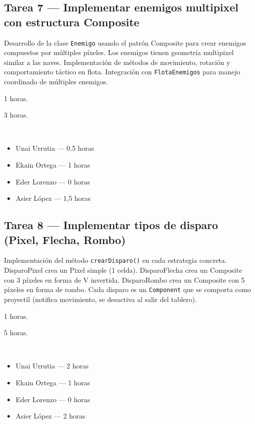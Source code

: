 \documentclass[12pt, a4paper]{article}
\begin{document}
\subsection*{Tarea 7 — Implementar enemigos multipixel con estructura Composite}
\begin{description}[leftmargin=2em, style=nextline]
    \item[\textbf{Descripción:}] Desarrollo de la clase \texttt{Enemigo} usando el patrón Composite para crear enemigos compuestos por múltiples píxeles. Los enemigos tienen geometría multipixel similar a las naves. Implementación de métodos de movimiento, rotación y comportamiento táctico en flota. Integración con \texttt{FlotaEnemigos} para manejo coordinado de múltiples enemigos.
    \item[\textbf{Tiempo estimado:}] 1 horas.
    \item[\textbf{Tiempo real:}] 3 horas.
    \item[\textbf{Responsables y dedicación:}]~
        \begin{itemize}[leftmargin=1em, nosep]
            \item Unai Urrutia — 0.5 horas
            \item Ekain Ortega — 1 horas
            \item Eder Lorenzo — 0 horas
            \item Asier López — 1,5 horas
        \end{itemize}
\end{description}

\vspace{0.8em}

\subsection*{Tarea 8 — Implementar tipos de disparo (Pixel, Flecha, Rombo)}
\begin{description}[leftmargin=2em, style=nextline]
    \item[\textbf{Descripción:}] Implementación del método \texttt{crearDisparo()} en cada estrategia concreta. DisparoPixel crea un Pixel simple (1 celda). DisparoFlecha crea un Composite con 3 píxeles en forma de V invertida. DisparoRombo crea un Composite con 5 píxeles en forma de rombo. Cada disparo es un \texttt{Component} que se comporta como proyectil (notifica movimiento, se desactiva al salir del tablero).
    \item[\textbf{Tiempo estimado:}] 1 horas.
    \item[\textbf{Tiempo real:}] 5 horas.
    \item[\textbf{Responsables y dedicación:}]~
        \begin{itemize}[leftmargin=1em, nosep]
            \item Unai Urrutia — 2 horas
            \item Ekain Ortega — 1 horas
            \item Eder Lorenzo — 0 horas
            \item Asier López — 2 horas
        \end{itemize}
\end{description}
\end{document}
